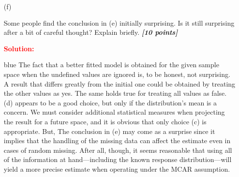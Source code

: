 \documentclass[12pt]{article}
\newcommand{\bi}[1]{\b{\i{#1}}}
\renewcommand{\b}[1]{\textbf{#1}}
\renewcommand{\i}[1]{\textit{#1}}
\begin{document}
\begin{itemize}
\begin{itemize}
\item[(f)]

Some people find the conclusion in (e) initially surprising. Is it still surprising after a bit of careful thought? Explain briefly. \bi{[10 points]}

\textbf{\textcolor{red}{Solution:}}
\begin{Solution4}{blue}
The fact that a better fitted model is obtained for the given sample space when the undefined values are ignored is, to be honest, not surprising. A result that differs greatly from the initial one could be obtained by treating the other values as yes. The same holds true for treating all values as false. (d) appears to be a good choice, but only if the distribution's mean is a concern. We must consider additional statistical measures when projecting the result for a future space, and it is obvious that only choice (c) is appropriate.  But, The conclusion in (e) may come as a surprise since it implies that the handling of the missing data can affect the estimate even in cases of random missing. After all, though, it seems reasonable that using all of the information at hand—including the known response distribution—will yield a more precise estimate when operating under the MCAR assumption.

\end{Solution4}

\vspace*{1.0in}

\end{itemize}

\end{itemize}
\end{document}
